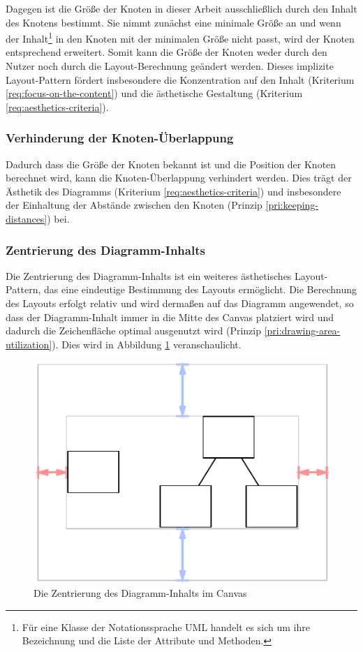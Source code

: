 Dagegen ist die Größe der Knoten in dieser Arbeit ausschließlich durch den Inhalt des Knotens bestimmt. Sie nimmt zunächst eine minimale Größe an und wenn der Inhalt\footnote{Für eine Klasse der Notationssprache UML handelt es sich um ihre Bezeichnung und die Liste der Attribute und Methoden.} in den Knoten mit der minimalen Größe nicht passt, wird der Knoten entsprechend erweitert. Somit kann die Größe der Knoten weder durch den Nutzer noch durch die Layout-Berechnung geändert werden. Dieses implizite Layout-Pattern fördert insbesondere die Konzentration auf den Inhalt (Kriterium \ref{req:focus-on-the-content}) und die ästhetische Gestaltung (Kriterium \ref{req:aesthetics-criteria}).

\subsubsection{Verhinderung der Knoten-Überlappung}

Dadurch dass die Größe der Knoten bekannt ist und die Position der Knoten berechnet wird, kann die Knoten-Überlappung verhindert werden. Dies trägt der Ästhetik des Diagramms (Kriterium \ref{req:aesthetics-criteria}) und insbesondere der Einhaltung der Abstände zwischen den Knoten (Prinzip \ref{pri:keeping-distances}) bei.

\subsubsection{Zentrierung des Diagramm-Inhalts}
\label{subsubsec:centering-of-diagram-content}

Die Zentrierung des Diagramm-Inhalts ist ein weiteres ästhetisches Layout-Pattern, das eine eindeutige Bestimmung des Layouts ermöglicht. Die Berechnung des Layouts erfolgt relativ und wird dermaßen auf das Diagramm angewendet, so dass der Diagramm-Inhalt immer in die Mitte des Canvas platziert wird und dadurch die Zeichenfläche optimal ausgenutzt wird (Prinzip \ref{pri:drawing-area-utilization}). Dies wird in Abbildung \ref{fig:layout-pattern-centered-content} veranschaulicht.

\begin{figure}[hbt]
    \centering
    \includegraphics{resources/layout-pattern-centered-content}
    \caption{Die Zentrierung des Diagramm-Inhalts im Canvas}
    \label{fig:layout-pattern-centered-content}
\end{figure}

